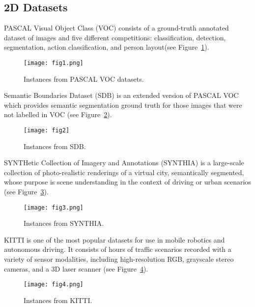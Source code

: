 \documentclass[10pt,twocolumn,letterpaper]{article}
\begin{document}
	\subsection*{2D Datasets}
	PASCAL Visual Object Class (VOC) consists of a ground-truth annotated dataset of images and five different competitions: classification, detection, segmentation, action classification, and person layout(see Figure~\ref{fig1}).
	\begin{figure}[h]
		\centering
		\texttt{[image: fig1.png]}
		\caption{Instances from PASCAL VOC datasets.}\label{fig1}
	\end{figure}
	\par
	Semantic Boundaries Dataset (SDB) is an extended version of PASCAL VOC which provides semantic segmentation ground truth for those images that were not labelled in VOC (see Figure~\ref{fig2}).
	\begin{figure}[h]
		\centering
		\texttt{[image: fig2]}
		\caption{Instances from SDB.}\label{fig2}
	\end{figure}
	\par
	SYNTHetic Collection of Imagery and Annotations (SYNTHIA) is a large-scale collection of photo-realistic renderings of a virtual city, semantically segmented, whose purpose is scene understanding in the context of driving or urban scenarios (see Figure~\ref{fig3}).
	\begin{figure}[h]
		\centering
		\texttt{[image: fig3.png]}
		\caption{Instances from SYNTHIA.}\label{fig3}
	\end{figure}
	\par
	KITTI is one of the most popular datasets for use in mobile robotics and autonomous driving. It consists of hours of traffic scenarios recorded with a variety of sensor modalities, including high-resolution RGB, grayscale stereo cameras, and a 3D laser scanner (see Figure~\ref{fig4}).
	\begin{figure}[h]
		\centering
		\texttt{[image: fig4.png]}
		\caption{Instances from KITTI.}\label{fig4}
	\end{figure}
\end{document}
